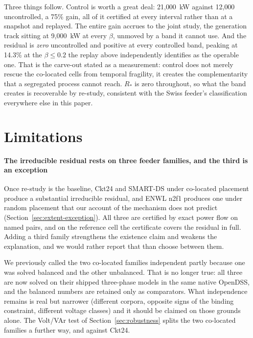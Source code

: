 \documentclass[review,authoryear,12pt]{elsarticle}
\begin{document}
Three things follow. Control is worth a great deal: 21{,}000~kW against
12{,}000 uncontrolled, a 75\% gain, all of it certified at every interval
rather than at a snapshot and replayed. The entire gain accrues to the joint
study, the generation track sitting at 9{,}000~kW at every $\beta$, unmoved by
a band it cannot use. And the residual is \emph{zero} uncontrolled and
positive at every controlled band, peaking at 14.3\% at the $\beta \le 0.2$ the
replay above independently identifies as the operable one. That is the
carve-out stated as a measurement: control does not merely rescue the
co-located cells from temporal fragility, it creates the complementarity that
a segregated process cannot reach. $R_{\ast}$ is zero throughout, so what the
band creates is recoverable by re-study, consistent with the Swiss feeder's
classification everywhere else in this paper.

\section{Limitations}
\label{sec:limitations}

\paragraph{The irreducible residual rests on three feeder families, and the
third is an exception}
Once re-study is the baseline, Ckt24 and SMART-DS under co-located placement
produce a substantial irreducible residual, and ENWL n2f1 produces one under
random placement that our account of the mechanism does not predict
(Section~\ref{sec:extent-exception}). All three are certified by exact power
flow on named pairs, and on the reference
cell the certificate covers the residual in full. Adding a third family
strengthens the existence claim and weakens the explanation, and we would
rather report that than choose between them.

We previously called the two co-located families independent partly because one
was solved balanced and the other unbalanced. That is no longer true: all three
are now solved on their shipped three-phase models in the same native OpenDSS,
and the balanced numbers are retained only as comparators. What independence
remains is real but narrower (different corpora, opposite signs of the
binding constraint, different voltage classes) and it should be claimed on
those grounds alone. The Volt/VAr test of Section~\ref{sec:robustness} splits
the two co-located families a further way, and against Ckt24.
\end{document}

